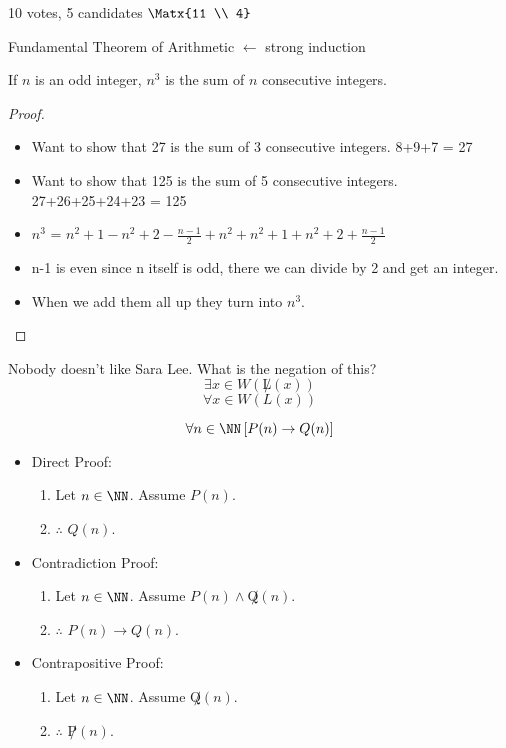 10 votes, 5 candidates $\Matx{11 \\ 4}$

Fundamental Theorem of Arithmetic $\leftarrow$ strong induction

\begin{example}
If $n$ is an odd integer, $n^3$ is the sum of $n$ consecutive integers.
\end{example}

\begin{proof}
\begin{itemize}
\item Want to show that 27 is the sum of 3 consecutive integers. 8+9+7 = 27
\item Want to show that 125 is the sum of 5 consecutive integers. 27+26+25+24+23 = 125
\item $n^3$ = $n^2+1-n^2+2-\frac{n-1}{2}+n^2+n^2+1+n^2+2+\frac{n-1}{2}$
\item n-1 is even since n itself is odd, there we can divide by 2 and get an integer.
\item When we add them all up they turn into $n^3$.
\end{itemize}
\end{proof}

\begin{example}
Nobody doesn't like Sara Lee. What is the negation of this?
\[\exists x \in W (\not L(x) )\]
\[ \forall x \in W ( L(x) )\]
\end{example}

\begin{example}
\[ \forall n \in \NN \left[ P(n) \to Q(n) \right] \]
\begin{itemize}
\item Direct Proof:
    \begin{enumerate}
        \item Let $n\in\NN$. Assume $P(n)$.
        \item $\therefore$ $Q(n)$.
    \end{enumerate}
\item Contradiction Proof:
    \begin{enumerate}
    \item Let $n\in\NN$. Assume $P(n) \wedge \not Q(n)$.
    \item $\therefore$ $P(n)\to Q(n)$.
    \end{enumerate}
\item Contrapositive Proof:
    \begin{enumerate}
    \item Let $n\in\NN$. Assume $\not Q(n)$.
    \item $\therefore$ $\not P(n)$.
    \end{enumerate}
\end{itemize}
\end{example}

